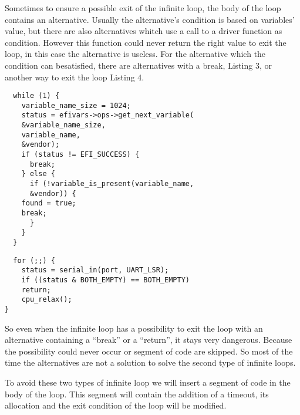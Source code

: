 \documentclass[a4paper,12pt]{article}
\begin{document}
\vspace{0.5cm}
Sometimes to ensure a possible exit of the infinite loop, the body of the loop contains an alternative. Usually the alternative's condition is based on variables' value, but there are also alternatives whitch use a call to a driver function as condition. However this function could never return the right value to exit the loop, in this case the alternative is useless. For the alternative which the condition can besatisfied, there are alternatives with a break, Listing 3, or another way to exit the loop Listing 4. 
\begin{lstlisting}
  while (1) {
    variable_name_size = 1024;
    status = efivars->ops->get_next_variable(
    &variable_name_size,
    variable_name,
    &vendor);
    if (status != EFI_SUCCESS) {
      break;
    } else {
      if (!variable_is_present(variable_name,
      &vendor)) {
	found = true;
	break;
      }
    }
  }
\end{lstlisting}

\begin{lstlisting}
  for (;;) {
    status = serial_in(port, UART_LSR);
    if ((status & BOTH_EMPTY) == BOTH_EMPTY)
    return;
    cpu_relax();
}
\end{lstlisting}
\vspace{0.5cm}
So even when the infinite loop has a possibility to exit the loop with an alternative containing a ``break'' or a ``return'', it stays very dangerous. Because the possibility could never occur or segment of code are skipped. 
So most of the time the alternatives are not a solution to solve the second type of infinite loops.



To avoid these two types of infinite loop we will insert a segment of code in the body of the loop. This segment will contain the addition of a timeout, its allocation and the exit condition of the loop will be modified.
\end{document}
